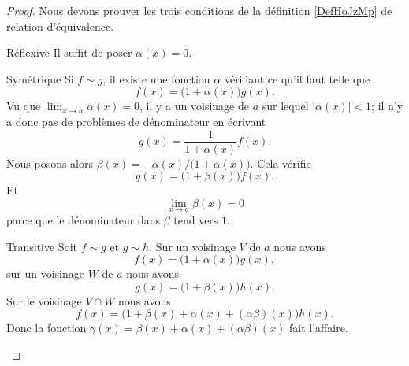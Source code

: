 \begin{proof}
    Nous devons prouver les trois conditions de la définition \ref{DefHoJzMp} de relation d'équivalence.
    \begin{subproof}
        \item[Réflexive]
            Il suffit de poser \( \alpha(x)=0\).
        \item[Symétrique]
            Si \( f\sim g\), il existe une fonction \( \alpha\) vérifiant ce qu'il faut telle que
            \begin{equation}
                f(x)=\big( 1+\alpha(x) \big)g(x).
            \end{equation}
            Vu que \( \lim_{x\to a} \alpha(x)=0\), il y a un voisinage de \( a\) sur lequel \( | \alpha(x) |<1\); il n'y a donc pas de problèmes de dénominateur en écrivant
            \begin{equation}
                g(x)=\frac{1}{ 1+\alpha(x) }f(x).
            \end{equation}
            Nous posons alors \( \beta(x)=-\alpha(x)/\big( 1+\alpha(x) \big)\). Cela vérifie
            \begin{equation}
                g(x)=\big( 1+\beta(x) \big)f(x).
            \end{equation}
            Et 
            \begin{equation}
                \lim_{x\to a} \beta(x)=0
            \end{equation}
            parce que le dénominateur dans \( \beta\) tend vers \( 1\).
        \item[Transitive]
            Soit \( f\sim g\) et \( g\sim h\). Sur un voisinage \( V\) de \( a\) nous avons
            \begin{equation}
                f(x)=\big( 1+\alpha(x) \big)g(x),
            \end{equation}
            sur un voisinage \( W\) de \( a\) nous avons
            \begin{equation}
                g(x)=\big( 1+\beta(x) \big)h(x).
            \end{equation}
            Sur le voisinage \( V\cap W\) nous avons
            \begin{equation}
                f(x)=\big( 1+\beta(x)+\alpha(x)+(\alpha\beta)(x) \big)h(x).
            \end{equation}
            Donc la fonction \( \gamma(x)=\beta(x)+\alpha(x)+(\alpha\beta)(x)\) fait l'affaire.
    \end{subproof}
\end{proof}

